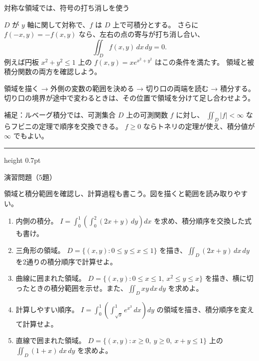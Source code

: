 \documentclass[a4paper,10pt,pdflatex,ja=standard,jafont=ipaex-type1,
  magstyle=real,scale=1]{bxjsarticle}
\newcommand{\topic}[1]{\par\vspace{5pt}%
  {\large\sffamily\mdseries\color{accent}#1}\par\vspace{2pt}}
\newcommand{\keybox}[1]{\par\vspace{3pt}\begingroup
  \setlength{\fboxsep}{4pt}%
  \colorbox{soft}{\parbox{\dimexpr\linewidth-2\fboxsep\relax}{\small #1}}%
  \endgroup\par\vspace{2pt}}
\newenvironment{problems}
  {\begin{enumerate}[leftmargin=2em,itemsep=3pt,topsep=3pt,parsep=0pt,
    font=\color{accent}]}
  {\end{enumerate}}
\newcommand{\examplelabel}[1]{{\sffamily\mdseries\color{ink}#1}}
\newcommand{\problemspace}{\par\vspace{5mm}}
\newcommand{\exercises}{%
  {\color{accent}\hrule height 0.7pt}\vspace{3pt}%
  \topic{演習問題（5題）}%
  {\small 領域と積分範囲を確認し、計算過程も書こう。図を描くと範囲を読み取りやすい。}\par}
\begin{document}
\begin{minipage}[b][\dimexpr0.5\textheight-\parskip\relax][t]{\linewidth}
\topic{対称な領域では、符号の打ち消しを使う}
\noindent\begin{minipage}[c]{0.73\linewidth}
$D$ が $y$ 軸に関して対称で、$f$ は $D$ 上で可積分とする。
さらに $f(-x,y)=-f(x,y)$ なら、左右の点の寄与が打ち消し合い、
$$
 \iint_D f(x,y)\,dx\,dy=0.
$$
例えば円板 $x^2+y^2\le1$ 上の $f(x,y)=xe^{x^2+y^2}$ はこの条件を満たす。
領域と被積分関数の両方を確認しよう。
\end{minipage}\hfill
\begin{minipage}[c]{0.25\linewidth}
\centering
{}
\end{minipage}\par
\keybox{領域を描く → 外側の変数の範囲を決める → 切り口の両端を読む → 積分する。
切り口の境界が途中で変わるときは、その位置で領域を分けて足し合わせよう。}
{\small\color{muted}補足：ルベーグ積分では、可測集合 $D$ 上の可測関数 $f$ に対し、
$\iint_D|f|<\infty$ ならフビニの定理で順序を交換できる。
$f\ge0$ ならトネリの定理が使え、積分値が $\infty$ でもよい。}\par
\end{minipage}\par\nointerlineskip
\noindent\begin{minipage}[b][0.5\textheight][t]{\linewidth}
\exercises
\begin{problems}
\item \examplelabel{内側の積分。}
$I=\displaystyle\int_0^1\left(\int_0^2(2x+y)\,dy\right)dx$ を求め、積分順序を交換した式も書け。
\problemspace
\item \examplelabel{三角形の領域。}
$D=\{(x,y):0\le y\le x\le1\}$ を描き、$\iint_D(2x+y)\,dx\,dy$ を2通りの積分順序で計算せよ。
\problemspace
\item \examplelabel{曲線に囲まれた領域。}
$D=\{(x,y):0\le x\le1,\ x^2\le y\le x\}$ を描き、横に切ったときの積分範囲を示せ。また、$\iint_Dxy\,dx\,dy$ を求めよ。
\problemspace
\item \examplelabel{計算しやすい順序。}
$I=\displaystyle\int_0^1\left(\int_{\sqrt y}^1e^{x^3}\,dx\right)dy$ の領域を描き、積分順序を変えて計算せよ。
\problemspace
\item \examplelabel{直線で囲まれた領域。}
$D=\{(x,y):x\ge0,\ y\ge0,\ x+y\le1\}$ 上の $\iint_D(1+x)\,dx\,dy$ を求めよ。
\problemspace
\end{problems}
\end{minipage}
\end{document}
